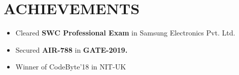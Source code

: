 \documentclass[11pt,a4paper,roman]{moderncv}        %
\begin{document}
{\section{ACHIEVEMENTS}
\begin{minipage}{\maincolumnwidth}%
	\small{
    	\begin{itemize}
          \item Cleared \textbf{SWC Professional Exam} in Samsung Electronics Pvt. Ltd.
          \item Secured \textbf{AIR-788} in \textbf{GATE-2019.}
          \item Winner of CodeByte'18 in NIT-UK
		\end{itemize}}%
\end{minipage}%
      
}
\nocite{*}



\end{document}
